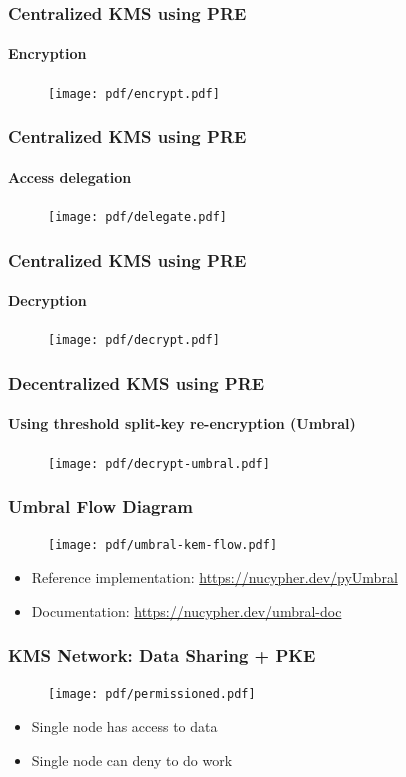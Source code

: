 \documentclass[xetex,mathsans,sans,aspectratio=169]{beamer}
\begin{document}
    \begin{frame}
        \frametitle{Centralized KMS using PRE}
        \framesubtitle{Encryption}
        \begin{figure}
            \centering
            \texttt{[image: pdf/encrypt.pdf]}
        \end{figure}
    \end{frame}

    \begin{frame}
        \frametitle{Centralized KMS using PRE}
        \framesubtitle{Access delegation}
        \begin{figure}
            \centering
            \texttt{[image: pdf/delegate.pdf]}
        \end{figure}
    \end{frame}

    \begin{frame}
        \frametitle{Centralized KMS using PRE}
        \framesubtitle{Decryption}
        \begin{figure}
            \centering
            \texttt{[image: pdf/decrypt.pdf]}
        \end{figure}
    \end{frame}

    \begin{frame}
        \frametitle{Decentralized KMS using PRE}
        \framesubtitle{Using threshold split-key re-encryption (Umbral)}
        \begin{figure}
            \centering
            \texttt{[image: pdf/decrypt-umbral.pdf]}
        \end{figure}
    \end{frame}

    \begin{frame}
      \frametitle{Umbral Flow Diagram}
      \begin{figure}
        \centering
        \texttt{[image: pdf/umbral-kem-flow.pdf]}
      \end{figure}
      \begin{itemize}
           \item Reference implementation: \url{https://nucypher.dev/pyUmbral}
           \item Documentation: \url{https://nucypher.dev/umbral-doc}
       \end{itemize}
    \end{frame}

    \begin{frame}
        \frametitle{KMS Network: Data Sharing + PKE}
        \begin{figure}
            \centering
            \texttt{[image: pdf/permissioned.pdf]}
        \end{figure}
        \begin{itemize}
            \item Single node has access to data
            \item Single node can deny to do work
        \end{itemize}
    \end{frame}
\end{document}
